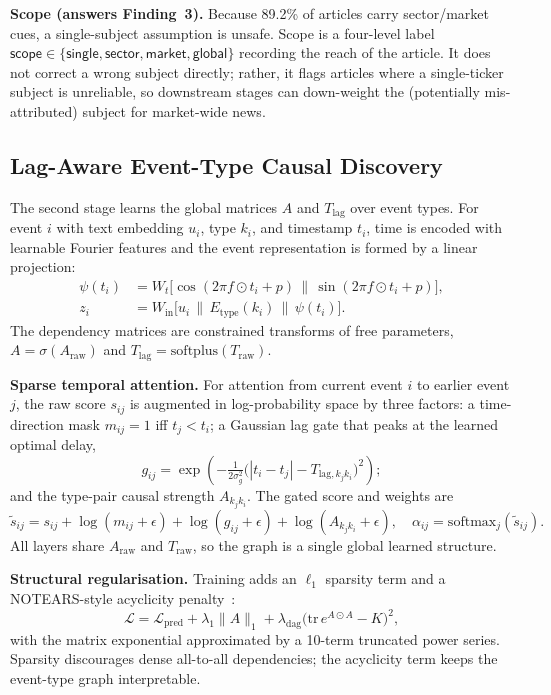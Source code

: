 \documentclass[sigconf,nonacm]{acmart}
\begin{document}
\textbf{Scope (answers Finding~3).}
Because 89.2\% of articles carry sector/market cues, a single-subject
assumption is unsafe. Scope is a four-level label
$\textsf{scope}\in\{\textsf{single},\textsf{sector},\textsf{market},
\textsf{global}\}$ recording the reach of the article. It does not
correct a wrong subject directly; rather, it flags articles where a
single-ticker subject is unreliable, so downstream stages can
down-weight the (potentially mis-attributed) subject for market-wide
news.

\subsection{Lag-Aware Event-Type Causal Discovery}
The second stage learns the global matrices $A$ and $T_{\mathrm{lag}}$
over event types. For event $i$ with text embedding $u_i$, type $k_i$,
and timestamp $t_i$, time is encoded with learnable Fourier features and
the event representation is formed by a linear projection:
\begin{align}
\psi(t_i)&=W_t\big[\cos(2\pi f\odot t_i+p)\,\|\,\sin(2\pi f\odot t_i+p)\big],\\
z_i&=W_{\mathrm{in}}\big[u_i\,\|\,E_{\mathrm{type}}(k_i)\,\|\,\psi(t_i)\big].
\end{align}
The dependency matrices are constrained transforms of free parameters,
$A=\sigma(A_{\mathrm{raw}})$ and
$T_{\mathrm{lag}}=\mathrm{softplus}(T_{\mathrm{raw}})$.

\textbf{Sparse temporal attention.} For attention from current event $i$
to earlier event $j$, the raw score $s_{ij}$ is augmented in
log-probability space by three factors: a time-direction mask $m_{ij}=1$
iff $t_j<t_i$; a Gaussian lag gate that peaks at the learned optimal
delay,
\begin{equation}
g_{ij}=\exp\!\left(-\tfrac{1}{2\sigma_g^{2}}\big(|t_i-t_j|-T_{\mathrm{lag},k_jk_i}\big)^{2}\right);
\end{equation}
and the type-pair causal strength $A_{k_jk_i}$. The gated score and
weights are
\begin{equation}
\tilde{s}_{ij}=s_{ij}+\log(m_{ij}{+}\epsilon)+\log(g_{ij}{+}\epsilon)+\log(A_{k_jk_i}{+}\epsilon),
\quad
\alpha_{ij}=\mathrm{softmax}_j(\tilde{s}_{ij}).
\end{equation}
All layers share $A_{\mathrm{raw}}$ and $T_{\mathrm{raw}}$, so the graph
is a single global learned structure.

\textbf{Structural regularisation.} Training adds an $\ell_1$ sparsity
term and a NOTEARS-style acyclicity penalty~\cite{notears}:
\begin{equation}
\mathcal{L}=\mathcal{L}_{\mathrm{pred}}
+\lambda_1\|A\|_1
+\lambda_{\mathrm{dag}}\big(\mathrm{tr}\,e^{A\odot A}-K\big)^{2},
\end{equation}
with the matrix exponential approximated by a 10-term truncated power
series. Sparsity discourages dense all-to-all dependencies; the
acyclicity term keeps the event-type graph interpretable.
\end{document}
